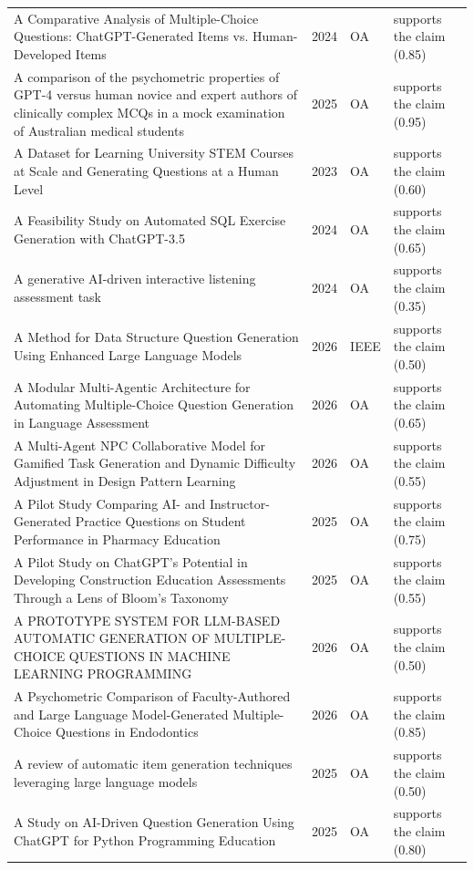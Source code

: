 \begin{longtable}{@{}%
  >{\raggedright\arraybackslash}p{}c%
  >{\raggedright\arraybackslash}p{}%
  >{\raggedright\arraybackslash}p{}@{}}
A Comparative Analysis of Multiple-Choice Questions: ChatGPT-Generated Items vs. Human-Developed Items & 2024 & OA & supports the claim (0.85) \\
A comparison of the psychometric properties of GPT-4 versus human novice and expert authors of clinically complex MCQs in a mock examination of Australian medical students & 2025 & OA & supports the claim (0.95) \\
A Dataset for Learning University STEM Courses at Scale and Generating Questions at a Human Level & 2023 & OA & supports the claim (0.60) \\
A Feasibility Study on Automated SQL Exercise Generation with ChatGPT-3.5 & 2024 & OA & supports the claim (0.65) \\
A generative AI-driven interactive listening assessment task & 2024 & OA & supports the claim (0.35) \\
A Method for Data Structure Question Generation Using Enhanced Large Language Models & 2026 & IEEE & supports the claim (0.50) \\
A Modular Multi-Agentic Architecture for Automating Multiple-Choice Question Generation in Language Assessment & 2026 & OA & supports the claim (0.65) \\
A Multi-Agent NPC Collaborative Model for Gamified Task Generation and Dynamic Difficulty Adjustment in Design Pattern Learning & 2026 & OA & supports the claim (0.55) \\
A Pilot Study Comparing AI- and Instructor-Generated Practice Questions on Student Performance in Pharmacy Education & 2025 & OA & supports the claim (0.75) \\
A Pilot Study on ChatGPT's Potential in Developing Construction Education Assessments Through a Lens of Bloom's Taxonomy & 2025 & OA & supports the claim (0.55) \\
A PROTOTYPE SYSTEM FOR LLM-BASED AUTOMATIC GENERATION OF MULTIPLE-CHOICE QUESTIONS IN MACHINE LEARNING PROGRAMMING & 2026 & OA & supports the claim (0.50) \\
A Psychometric Comparison of Faculty-Authored and Large Language Model-Generated Multiple-Choice Questions in Endodontics & 2026 & OA & supports the claim (0.85) \\
A review of automatic item generation techniques leveraging large language models & 2025 & OA & supports the claim (0.50) \\
A Study on AI-Driven Question Generation Using ChatGPT for Python Programming Education & 2025 & OA & supports the claim (0.80) \\

\end{longtable}
